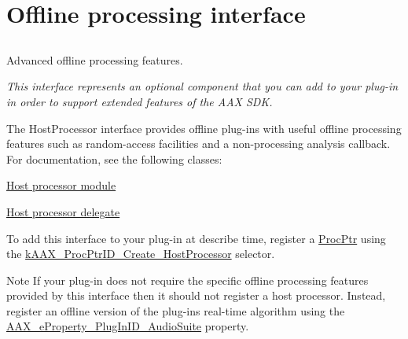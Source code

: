 \hypertarget{a00334}{}\section{Offline processing interface}
\label{a00334}


\subsection{ }
Advanced offline processing features. 

{\itshape This interface represents an optional component that you can add to your plug-\/in in order to support extended features of the A\+A\+X S\+D\+K.}

The Host\+Processor interface provides offline plug-\/ins with useful offline processing features such as random-\/access facilities and a non-\/processing analysis callback. For documentation, see the following classes\+:
\begin{DoxyItemize}
\item \hyperlink{a00020}{Host processor module}
\item \hyperlink{a00068}{Host processor delegate}
\end{DoxyItemize}

To add this interface to your plug-\/in at describe time, register a \hyperlink{a00096_ad1a286ef7cb869e6f79423dd774ec976}{Proc\+Ptr} using the \hyperlink{a00163_af0682195d377392ad356fd2b00c36892a04ce687ba05b8c7c2cce0b32d868f3db}{k\+A\+A\+X\+\_\+\+Proc\+Ptr\+I\+D\+\_\+\+Create\+\_\+\+Host\+Processor} selector.

\begin{DoxyNote}{Note}
If your plug-\/in does not require the specific offline processing features provided by this interface then it should not register a host processor. Instead, register an offline version of the plug-\/in\textquotesingle{}s real-\/time algorithm using the \hyperlink{a00283_a6571f4e41a5dd06e4067249228e2249ead3344696b8298a8b254add3d039ea927}{A\+A\+X\+\_\+e\+Property\+\_\+\+Plug\+In\+I\+D\+\_\+\+Audio\+Suite} property. 
\end{DoxyNote}
